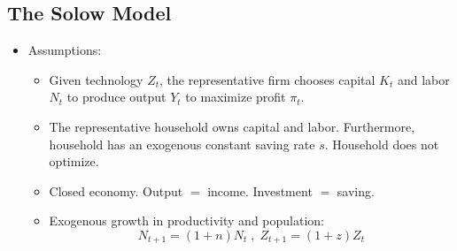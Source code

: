 \documentclass[notitlepage]{article}
\begin{document}
\subsection{The Solow Model}
\begin{itemize}
\item Assumptions:
\begin{itemize}
\item Given technology $Z_t$, the representative firm chooses capital $K_t$ and labor $N_t$ to produce output $Y_t$ to maximize profit $\pi_t$.
\item The representative household owns capital and labor. Furthermore, household has an exogenous constant saving rate $s$. Household does not optimize.
\item Closed economy. Output $=$ income. Investment $=$ saving.
\item Exogenous growth in productivity and population:
\[
N_{t+1} = (1+n)N_t \;,\; Z_{t+1} = (1+z)Z_t
\]
\end{itemize}


\end{itemize}
\end{document}
